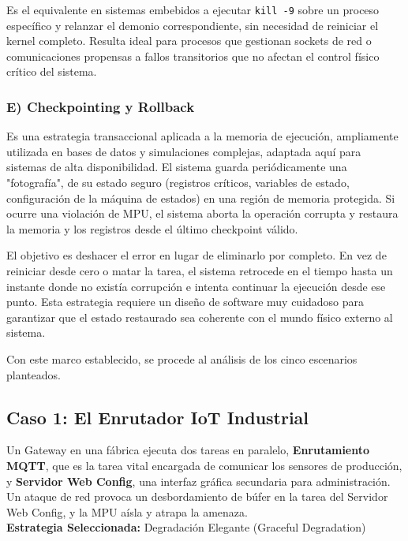 \documentclass[12pt,letterpaper]{article}
\begin{document}
Es el equivalente en sistemas embebidos a ejecutar \texttt{kill -9} sobre un proceso específico y relanzar el
demonio correspondiente, sin necesidad de reiniciar el kernel completo. Resulta ideal para procesos que
gestionan sockets de red o comunicaciones propensas a fallos transitorios que no afectan el control físico
crítico del sistema.
 
\subsubsection*{E) Checkpointing y Rollback} 
Es una estrategia transaccional aplicada a la memoria de ejecución, ampliamente utilizada en bases de datos y
simulaciones complejas, adaptada aquí para sistemas de alta disponibilidad. El sistema guarda periódicamente una
"fotografía", de su estado seguro (registros críticos, variables de estado, configuración de la máquina de
estados) en una región de memoria protegida. Si ocurre una violación de MPU, el sistema aborta la operación
corrupta y restaura la memoria y los registros desde el último checkpoint válido.
 
El objetivo es deshacer el error en lugar de eliminarlo por completo. En vez de reiniciar
desde cero o matar la tarea, el sistema retrocede en el tiempo hasta un instante donde no
existía corrupción e intenta continuar la ejecución desde ese punto. Esta estrategia requiere
un diseño de software muy cuidadoso para garantizar que el estado restaurado sea coherente
con el mundo físico externo al sistema.
 
\bigskip

Con este marco establecido, se procede al análisis de los cinco escenarios planteados.
 
\subsection*{Caso 1: El Enrutador IoT Industrial}
Un Gateway en una fábrica ejecuta dos tareas en paralelo, \textbf{Enrutamiento MQTT}, que es la tarea vital
encargada de comunicar los sensores de producción, y \textbf{Servidor Web Config}, una interfaz gráfica
secundaria para administración. Un ataque de red provoca un desbordamiento de búfer en la tarea del Servidor Web
Config, y la MPU aísla y atrapa la amenaza.\\

\textbf{Estrategia Seleccionada:} Degradación Elegante (Graceful Degradation)\\
\end{document}
